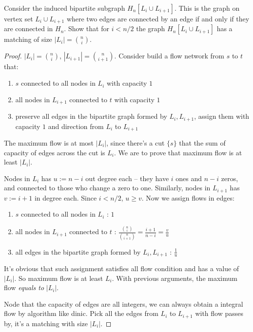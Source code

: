 \documentclass[11pt,a4paper,oneside]{article}
\begin{document}
\begin{problem}{4}
  \statement
  Consider the induced bipartite subgraph $H_n[ L_i \cup L_{i+1}]$. This is 
  the graph on vertex set $L_i \cup L_{i+1}$ where two edges are connected
  by an edge if and only if they are connected in $H_n$.
  Show that for $i < n/2$ the graph $H_n[ L_i \cup L_{i+1}]$
  has a matching of size $|L_i| = {n \choose i}$.
  
  \solution
  \begin{proof}
    $|L_i| = {n \choose i}$, $|L_{i + 1}| =  {n \choose {i + 1}}$. Consider build a flow network from $s$ to $t$ that:
    \begin{enumerate}
      \item $s$ connected to all nodes in $L_i$ with capacity $1$
      \item all nodes in $L_{i + 1}$ connected to $t$ with capacity $1$
      \item preserve all edges in the bipartite graph formed by $L_{i}, L_{i + 1}$, assign them with capacity $1$ and direction from $L_{i}$ to $L_{i + 1}$
    \end{enumerate}
    The maximum flow is at most $|L_{i}|$, since there's a cut $\{s\}$ that the sum of capacity of edges across the cut is $L_{i}$. We are to prove that maximum flow is at least $|L_{i}|$. 

    Nodes in $L_{i}$ has $u := n - i$ out degree each -- they have $i$ ones and $n - i$ zeros, and connected to those who change a zero to one. Similarly, nodes in $L_{i + 1}$ has $v := i + 1$ in degree each. Since $i < n / 2$, $u \geq v$. Now we assign flows in edges:
    \begin{enumerate}
      \item $s$ connected to all nodes in $L_i$ : $1$
      \item all nodes in $L_{i + 1}$ connected to $t$ : $\frac {{n \choose i}} {{n \choose {i + 1}}} = \frac {i + 1} {n - i} = \frac v u$
      \item all edges in the bipartite graph formed by $L_{i}, L_{i + 1}$ : $\frac 1 u$
    \end{enumerate}
 
    It's obvious that such assignment satisfies all flow condition and has a value of $|L_i|$. So maximum flow is at least $L_i$. With previous arguments, the maximum flow \textit{equals to} $|L_i|$.
 
    Node that the capacity of edges are all integers, we can always obtain a integral flow by algorithm like dinic. Pick all the edges from $L_{i}$ to $L_{i + 1}$ with flow passes by, it's a matching with size $|L_i|$.
    
  \end{proof}
\end{problem}
\end{document}

